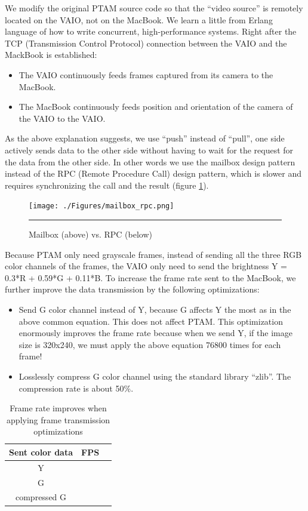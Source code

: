We modify the original PTAM source code so that the ``video source'' is remotely located on the VAIO, not on the MacBook. We learn a little from Erlang language \citep{Reference17} of how to write concurrent, high-performance systems. Right after the TCP (Transmission Control Protocol) connection between the VAIO and the MackBook is established:

\begin{itemize}
	\item The VAIO continuously feeds frames captured from its camera to the MacBook.
	\item The MacBook continuously feeds position and orientation of the camera of the VAIO to the VAIO.
\end{itemize}

As the above explanation suggests, we use ``push'' instead of ``pull'', one side actively sends data to the other side without having to wait for the request for the data from the other side. In other words we use the mailbox design pattern instead of the RPC (Remote Procedure Call) design pattern, which is slower and requires synchronizing the call and the result (figure \ref{fig:MailboxRPC}).

\begin{figure}[htbp]
	\centering
	\texttt{[image: ./Figures/mailbox\_rpc.png]}
	\rule{35em}{0.5pt}
	\caption[Mailbox vs. RPC]{Mailbox (above) vs. RPC (below)}
	\label{fig:MailboxRPC}
\end{figure}

Because PTAM only need grayscale frames, instead of sending all the three RGB color channels of the frames, the VAIO only need to send the brightness Y = 0.3*R + 0.59*G + 0.11*B. To increase the frame rate sent to the MacBook, we further improve the data transmission by the following optimizations:

\begin{itemize}
	\item Send G color channel instead of Y, because G affects Y the most as in the above common equation. This does not affect PTAM. This optimization enormously improves the frame rate because when we send Y, if the image size is 320x240, we must apply the above equation 76800 times for each frame!
	\item Losslessly compress G color channel using the standard library ``zlib''. The compression rate is about 50\%.
\end{itemize}

\begin{table}[tb]
	\begin{center}
		\begin{tabular}{|c|l|l|}
			\hline
			Sent color data & FPS \\
			\hline
			Y               &     \\
			G               &     \\
			compressed G    &     \\
			\hline
		\end{tabular}
		\caption{Frame rate improves when applying frame transmission optimizations}
	\end{center}
\end{table}

